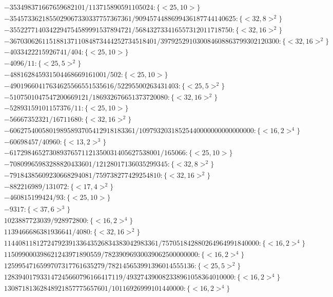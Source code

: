 \documentclass[11pt,reqno]{amsart}
\theoremstyle{plain}
\theoremstyle{definition}
\begin{document}
{\begin{align*}
&-353498371667659682101/113715890591105024:\{ <25, 10> \}\\
&-3545733621855029067330337757367361/9094574488699436187744140625:\{ <32, 8>^2 \}\\
&-3552277140342294754589991537894721/568432733416557312011718750:\{ <32, 16>^2 \}\\
&-36703062611518813711084873444252734518401/397925291030084608863799302120300:\{ <32, 16>^2 \}\\
&-4033422215926741/404:\{ <25, 10> \}\\
&-4096/11:\{ <25, 5>^2 \}\\
&-488162845931504468669161001/502:\{<25, 10> \}\\
&-49019660417634625566551535616/52295500263431403:\{ <25, 5>^2 \}\\
&-5107501047547200669121/186932676651373720080:\{ <32, 16>^2 \}\\
&-52893159101157376/11:\{ <25, 10> \}\\
&-56667352321/16711680:\{ <32, 16>^2 \}\\
&-60627540058019895893705412918183361/10979320318525440000000000000000:\{ <16, 2>^4 \}\\
&-60698457/40960:\{ <13, 2>^3 \}\\
&-617298465273089376571121350031405627538001/165066:\{ <25, 10> \}\\
&-70809965983288820433601/12128017136035299345:\{ <32, 8>^2 \}\\
&-79184385609230668294081/759738277429254810:\{ <32, 16>^2 \}
\end{align*}
\begin{align*}
&-882216989/131072: \{ <17, 4>^2\}\\
&-460815199424/93:\{ <25, 10> \}\\
&-9317:\{ <37, 6>^3 \}\\
&1023887723039/928972800:\{ <16, 2>^4 \}\\
&1139466686381936641/4080:\{ <32, 16>^2 \}\\
&1144081181272479239133643526834383042983361/757051842880264964991840000:\{ <16, 2>^4 \}\\
&115099000398621243971890559/78239096930039062500000000:\{ <16, 2>^4 \}\\
&1259954716599707317761635279/782145653991396014555136:\{ <25, 5>^2 \}\\
&128394017933147245660796166417119/493274390082338961058364010000:\{ <16, 2>^4 \}\\
&13087181362848921857775657601/10116926999101440000:\{ <16, 2>^4 \}\\

\end{align*}}
\end{document}
